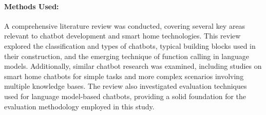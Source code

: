 \paragraph{Methods Used:}

A comprehensive literature review was conducted, covering several key areas relevant to chatbot development and smart home technologies. This review explored the classification and types of chatbots, typical building blocks used in their construction, and the emerging technique of function calling in language models. Additionally, similar chatbot research was examined, including studies on smart home chatbots for simple tasks and more complex scenarios involving multiple knowledge bases. The review also investigated evaluation techniques used for language model-based chatbots, providing a solid foundation for the evaluation methodology employed in this study.

